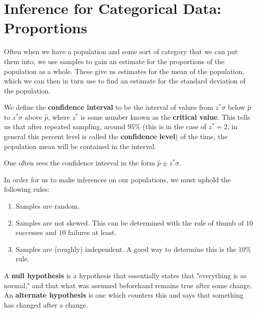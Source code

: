\section{Inference for Categorical Data: Proportions}

Often when we have a population and some sort of category that we can put them
into, we use samples to gain an estimate for the proportions of the population
as a whole. These give us estimates for the mean of the population, which we can then in turn use to find an estimate for the standard deviation of the population.

\begin{blackbox}
    \begin{definition}
        We define the \textbf{confidence interval} to be the interval of values
        from \( z^* \sigma \) below \( \hat{p} \) to \( z^* \sigma \) above \(
        \hat{p} \), where \( z^* \) is some number known as the
        \textbf{critical value}. This tells us that after repeated sampling,
        around \( 95\% \) (this is in the case of \( z^* = 2 \), in general
        this percent level is called the \textbf{confidence level}) of the
        time, the population mean will be contained in the interval.
    \end{definition}
\end{blackbox}

\begin{example}
    One often sees the confidence interval in the form \( \hat{p} \pm z^* \sigma \).
\end{example}

In order for us to make inferences on our populations, we must uphold the following rules:
\begin{enumerate}
    \item Samples are random.
    \item Samples are not skewed. This can be determined with the rule of thumb
        of \( 10 \) successes and \( 10 \) failures at least.
    \item Samples are (roughly) independent. A good way to determine this is
        the \( 10\% \) rule.
\end{enumerate}

\begin{blackbox}
    \begin{definition}
        A \textbf{null hypothesis} is a hypothesis that essentially states that
        "everything is as normal," and that what was assumed beforehand remains
        true after some change. An \textbf{alternate hypothesis} is one which
        counters this and says that something has changed after a change.
    \end{definition}
\end{blackbox}


